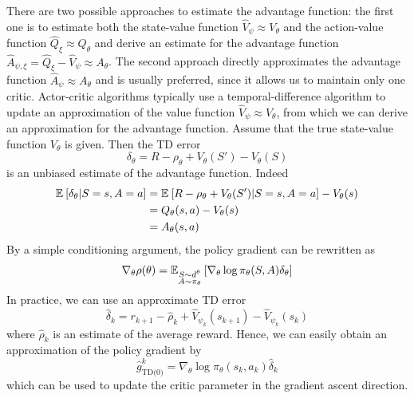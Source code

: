 There are two possible approaches to estimate the advantage function: the first one is to estimate both the state-value function $\widehat{V}_\psi \approx V_\theta$ and the action-value function $\widehat{Q}_\xi \approx Q_\theta$ and derive an estimate for the advantage function $\widehat{A}_{\psi, \xi} = \widehat{Q}_\xi - \widehat{V}_\psi \approx A_\theta$. The second approach directly approximates the advantage function $\widehat{A}_\psi \approx A_\theta$ and is usually preferred, since it allows us to maintain only one critic. Actor-critic algorithms typically use a temporal-difference algorithm to update an approximation of the value function $\widehat{V}_\psi \approx V_\theta$, from which we can derive an approximation for the advantage function. Assume that the true state-value function $V_\theta$ is given. Then the TD error 
\begin{equation}
	\delta_\theta = R - \rho_\theta + V_\theta(S') - V_\theta(S)
\end{equation}
is an unbiased estimate of the advantage function. Indeed 
\begin{equation*}
	\begin{split}
		\E{\delta_\theta | S = s, A = a} &= \E{R - \rho_\theta + V_\theta(S') | S = s, A = a} - V_\theta(s)\\
		&= Q_\theta(s,a) - V_\theta(s)\\
		&= A_\theta(s,a)  
	\end{split}
\end{equation*}
By a simple conditioning argument, the policy gradient can be rewritten as
\begin{equation}
	\nabla_\theta \rho(\theta) =
			\E[\substack{S \sim d^\theta\\A \sim \pi_\theta}]{\nabla_\theta\log
			\pi_\theta(S,A) \delta_\theta}
\end{equation} 
In practice, we can use an approximate TD error 
\begin{equation}
\label{eq:td_error}
	\widehat{\delta}_k = r_{k+1} - \widehat{\rho}_k + \widehat{V}_{\psi_k}(s_{k+1}) - \widehat{V}_{\psi_k}(s_k) 
\end{equation}
where $\widehat{\rho}_k$ is an estimate of the average reward. Hence, we can easily obtain an approximation of the policy gradient by
\begin{equation}
	\widehat{g}_\text{TD(0)}^k = \nabla_\theta\log \pi_\theta(s_k,a_k) \widehat{\delta}_k
\end{equation}
which can be used to update the critic parameter in the gradient ascent direction. 
